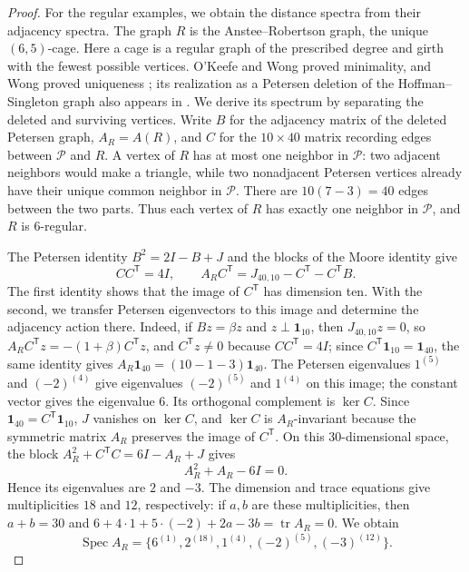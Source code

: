 \documentclass[a4paper,10pt,reqno]{amsart}
\theoremstyle{plain}
\theoremstyle{definition}
\theoremstyle{remark}
\newcommand{\one}{\mathbf 1}
\newcommand{\Spec}{\operatorname{Spec}}
\newcommand{\tr}{\operatorname{tr}}
\begin{document}
\begin{proof}
For the regular examples, we obtain the distance spectra from their
adjacency spectra. The graph \(R\) is the Anstee--Robertson graph, the unique \((6,5)\)-cage.
Here a cage is a regular graph of the prescribed degree and girth with the
fewest possible vertices.
O'Keefe and Wong proved minimality, and Wong proved uniqueness
\cite{OKeefeWong1979,Wong1979}; its realization as a Petersen deletion of the
Hoffman--Singleton graph also appears in
\cite[pp.~262--263]{KlinMuzychukZivAv2009}.
We derive its spectrum by separating the deleted and surviving vertices.
Write \(B\) for the adjacency matrix of the deleted Petersen graph,
\(A_R=A(R)\), and \(C\) for the \(10\times40\) matrix recording edges between
\(\mathcal P\) and \(R\).
A vertex of \(R\) has at most one neighbor in \(\mathcal P\): two adjacent
neighbors would make a triangle, while two nonadjacent Petersen vertices
already have their unique common neighbor in \(\mathcal P\).
There are \(10(7-3)=40\) edges between the two parts. Thus each vertex of
\(R\) has exactly one neighbor in \(\mathcal P\), and \(R\) is \(6\)-regular.

The Petersen identity \(B^2=2I-B+J\) and the blocks of the Moore identity give
\[
 CC^{\mathsf T}=4I,\qquad
 A_RC^{\mathsf T}=J_{40,10}-C^{\mathsf T}-C^{\mathsf T}B.
\]
The first identity shows that the image of \(C^{\mathsf T}\) has dimension ten.
With the second, we transfer Petersen eigenvectors to this image and
determine the adjacency action there. Indeed, if \(Bz=\beta z\) and \(z\perp\one_{10}\),
then \(J_{40,10}z=0\), so \(A_RC^{\mathsf T}z=-(1+\beta)C^{\mathsf T}z\), and
\(C^{\mathsf T}z\ne0\) because \(CC^{\mathsf T}=4I\); since
\(C^{\mathsf T}\one_{10}=\one_{40}\), the same identity gives
\(A_R\one_{40}=(10-1-3)\one_{40}\). The Petersen eigenvalues \(1^{(5)}\) and \((-2)^{(4)}\) give eigenvalues
\((-2)^{(5)}\) and \(1^{(4)}\) on this image; the constant vector gives
the eigenvalue \(6\). Its orthogonal complement is \(\ker C\).
Since \(\one_{40}=C^{\mathsf T}\one_{10}\), \(J\) vanishes on \(\ker C\), and
\(\ker C\) is \(A_R\)-invariant because the symmetric matrix \(A_R\) preserves
the image of \(C^{\mathsf T}\).
On this \(30\)-dimensional space, the block
\(A_R^2+C^{\mathsf T}C=6I-A_R+J\) gives
\[
 A_R^2+A_R-6I=0.
\]
Hence its eigenvalues are \(2\) and \(-3\). The dimension and trace
equations give multiplicities \(18\) and \(12\), respectively: if \(a,b\) are these
multiplicities, then \(a+b=30\) and
\(6+4\cdot1+5\cdot(-2)+2a-3b=\tr A_R=0\). We obtain
\[
 \Spec A_R=\{6^{(1)},2^{(18)},1^{(4)},(-2)^{(5)},(-3)^{(12)}\}.
\]


\end{proof}
\end{document}
